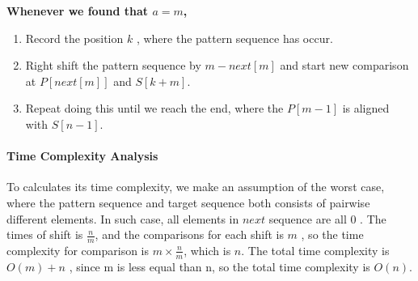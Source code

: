 \begin{questions}
\begin{itemize}
              \textbf{Whenever we found that $a = m$,}
              \begin{enumerate}
                  \item Record the position $k$ , where the pattern sequence has occur.
                  \item Right shift the pattern sequence by $m-next[m]$ and start new comparison at $P[next[m]]$ and $S[k+m]$.
                  \item Repeat doing this until we reach the end, where the $P[m-1]$ is aligned with $S[n-1]$.
              \end{enumerate}
    \end{itemize}

    \paragraph{Time Complexity Analysis}To calculates its time complexity, we make an assumption of the worst case, where the pattern sequence and target sequence both consists of pairwise different elements. In such case, all elements in $next$ sequence are all $0$ . The times of shift is $\frac{n}{m}$, and the comparisons for each shift is $m$ , so the time complexity for comparison is $m\times\frac{n}{m} $, which is $n$. The total time complexity is $O(m)+n$ , since m is less equal than n, so the total time complexity is $O(n)$.

\end{questions}
